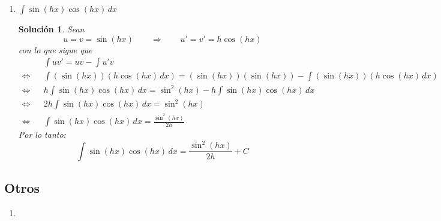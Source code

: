 \documentclass[a4paper,11pt]{article}
\theoremstyle{teoremas}
\theoremstyle{ejemplos}
\theoremstyle{definiciones}
\theoremstyle{lemas}
\newtheorem*{solucion}{Soluci\'on}
\begin{document}
\begin{enumerate}
 \item $\int \sin(hx) \cos (hx) \, dx$
 \begin{solucion}
    Sean
  \begin{equation*}
   u = v = \sin(hx) \qquad \Rightarrow \qquad u' = v' = h\cos(hx)
  \end{equation*}
  con lo que sigue que
  \begin{eqnarray*}
    & &\int uv' = uv - \int u'v  \\
   \Leftrightarrow & & \int \left( \sin(hx) \right) \left( h\cos(hx) \, dx \right) = \left( \sin(hx) \right) \left( \sin(hx) \right) - \int \left( \sin(hx) \right) \left( h\cos(hx) \, dx \right) \\
   \Leftrightarrow & & h\int \sin(hx)\cos(hx) \, dx = \sin^2(hx) - h \int \sin(hx)\cos(hx) \, dx \\
   \Leftrightarrow & & 2h \int \sin(hx)\cos(hx) \, dx =  \sin^2(hx) \\
   \Leftrightarrow & & \int \sin(hx)\cos(hx) \, dx = \frac{ \sin^2(hx) }{2h}
  \end{eqnarray*}
  Por lo tanto:
  \begin{equation}
   \int \sin(hx)\cos(hx) \, dx = \frac{ \sin^2(hx) }{2h} + C
  \end{equation}
 \end{solucion}

\end{enumerate}

\subsection{Otros}

\begin{enumerate}
 \item $$
\end{enumerate}
\end{document}
